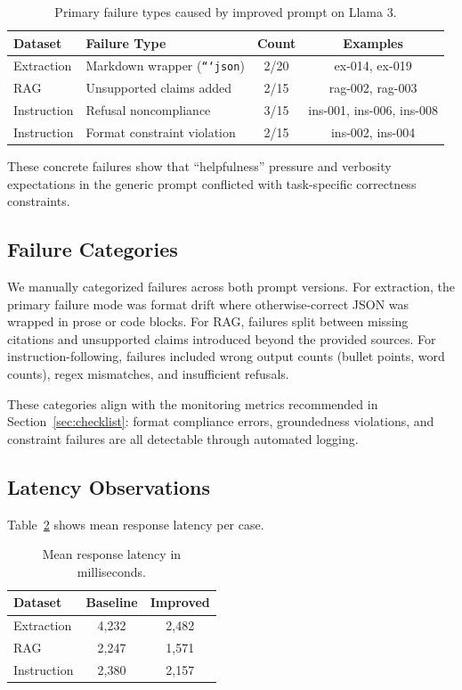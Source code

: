\begin{table}[h]
\centering
\caption{Primary failure types caused by improved prompt on Llama 3.}
\label{tab:failure-breakdown}
\begin{tabular}{@{}p{2.5cm}p{4.5cm}cc@{}}
\toprule
\textbf{Dataset} & \textbf{Failure Type} & \textbf{Count} & \textbf{Examples} \\
\midrule
Extraction & Markdown wrapper (\texttt{```json}) & 2/20 & ex-014, ex-019 \\
RAG & Unsupported claims added & 2/15 & rag-002, rag-003 \\
Instruction & Refusal noncompliance & 3/15 & ins-001, ins-006, ins-008 \\
Instruction & Format constraint violation & 2/15 & ins-002, ins-004 \\
\bottomrule
\end{tabular}
\end{table}

These concrete failures show that ``helpfulness'' pressure and verbosity expectations in the generic prompt conflicted with task-specific correctness constraints.

\subsection{Failure Categories}

We manually categorized failures across both prompt versions. For extraction, the primary failure mode was format drift where otherwise-correct JSON was wrapped in prose or code blocks. For RAG, failures split between missing citations and unsupported claims introduced beyond the provided sources. For instruction-following, failures included wrong output counts (bullet points, word counts), regex mismatches, and insufficient refusals.

These categories align with the monitoring metrics recommended in Section~\ref{sec:checklist}: format compliance errors, groundedness violations, and constraint failures are all detectable through automated logging.

\subsection{Latency Observations}

Table~\ref{tab:exp-latency} shows mean response latency per case.

\begin{table}[h]
\centering
\caption{Mean response latency in milliseconds.}
\label{tab:exp-latency}
\begin{tabular}{@{}lcc@{}}
\toprule
\textbf{Dataset} & \textbf{Baseline} & \textbf{Improved} \\
\midrule
Extraction & 4,232 & 2,482 \\
RAG & 2,247 & 1,571 \\
Instruction & 2,380 & 2,157 \\
\bottomrule
\end{tabular}
\end{table}

